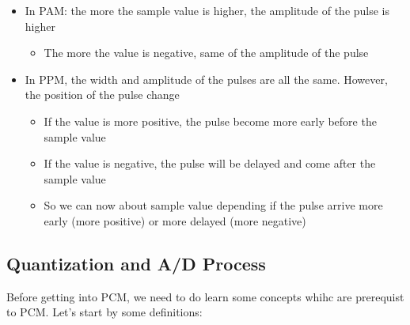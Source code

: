 \documentclass[12pt,a4paper]{book}
\begin{document}
\begin{itemize}

\item In PAM: the more the sample value is higher, the amplitude of the pulse is higher

	\begin{itemize}
	\item The more the value is negative, same of the amplitude of the pulse
	\end{itemize}

\item In PPM, the width and amplitude of the pulses are all the same. However, the position of the pulse change

	\begin{itemize}
	\item If the value is more positive, the pulse become more early before the sample value
	
	\item If the value is negative, the pulse will be delayed and come after the sample value
	
	\item So we can now about sample value depending if the pulse arrive more early (more positive) or more delayed (more negative)
	\end{itemize}

\end{itemize}


\subsection{Quantization and A/D Process}

Before getting into PCM, we need to do learn some concepts whihc are prerequist to PCM. Let's start by some definitions:
\end{document}
